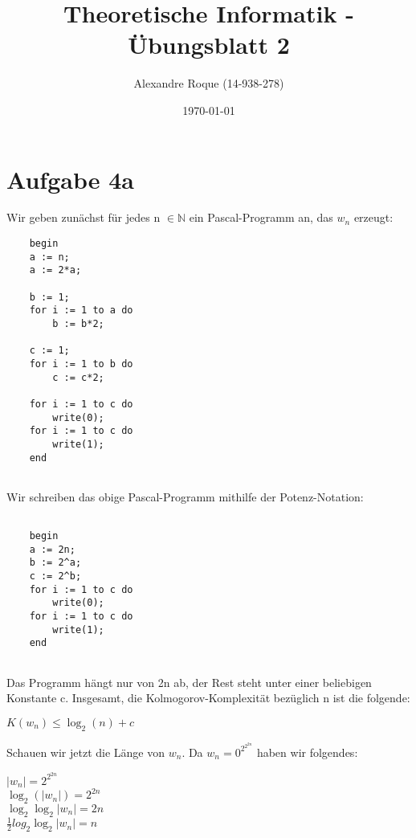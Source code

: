 \documentclass{article}
\title{Theoretische Informatik - Übungsblatt 2}
\author{Alexandre Roque (14-938-278)}
\date{\today}
\begin{document}
    \maketitle
    
    \section*{Aufgabe 4a}
    
    Wir geben zunächst für jedes n $\in \mathbb{N}$  ein Pascal-Programm an, das $w_{n}$ erzeugt:
    
    \lstset{language=Pascal}
    \begin{lstlisting}
    begin
    a := n;
    a := 2*a;
    
    b := 1;
    for i := 1 to a do
    	b := b*2;
    	
    c := 1;
    for i := 1 to b do 
    	c := c*2;
    	
    for i := 1 to c do
    	write(0);
    for i := 1 to c do
    	write(1);	 		
    end
    	
    \end{lstlisting}
    
    \par
    \noindent
    Wir schreiben das obige Pascal-Programm mithilfe der Potenz-Notation:     \lstset{language=Pascal}
    \begin{lstlisting}
    	
	begin
	a := 2n;
	b := 2^a;
	c := 2^b;
	for i := 1 to c do 
		write(0);
	for i := 1 to c do
		write(1);
	end  	
    	
    \end{lstlisting}
    
    \par
    
    Das Programm hängt nur von 2n ab, der Rest steht unter einer beliebigen Konstante c.
    Insgesamt, die Kolmogorov-Komplexität bezüglich n ist die folgende:
    
    \par
    
    \begin{center}
    	$K(w_{n}) \le \log_{2}(n)+ c$
    \end{center}
    
    \par
    
    Schauen wir jetzt die Länge von $w_{n}$. Da $w_{n} = 0^{2^{2^{2n}}}$ haben wir folgendes: 
    
    \begin{center}
    $|w_{n}| = 2^{2^{2n}}$ \\
    $\log_{2}(|w_{n}|) = 2^{2n}$ \\
    $\log_{2} \log_{2} |w_{n}|= 2n$ \\
    $\frac{1}{2} log_{2} \log_{2} |w_{n}|= n$
    \end{center}
    
\end{document}
